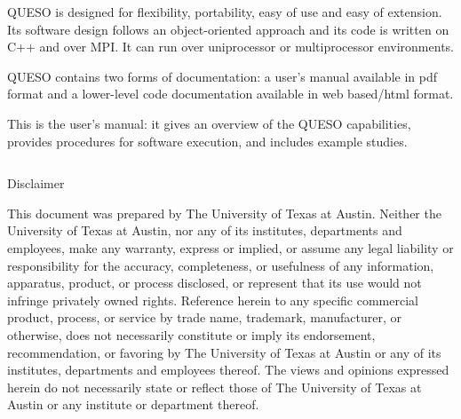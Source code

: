 QUESO is designed for flexibility, portability, easy of use and
easy of extension. Its software design follows an object-oriented
approach and its code is written on C++ and over MPI. It can run over
uniprocessor or multiprocessor environments.

QUESO contains two forms of documentation:
a user's manual available in pdf format
and
a lower-level code documentation available in web based/html format.

This is the user's manual: it gives an overview of the QUESO capabilities,
provides procedures for software execution, and includes example studies.

\clearpage
$~$\\

\clearpage
\centerline{\LARGE\sffamily Disclaimer}
$~$\\
    This document was prepared
    by The University of Texas at Austin.
    Neither the University of Texas
    at Austin, nor any of its institutes, departments and employees, make any warranty, express or implied,
    or assume any legal liability or responsibility for the accuracy, completeness, or
    usefulness of any information, apparatus, product, or process disclosed, or represent
    that its use would not infringe privately owned rights. Reference herein to any specific
    commercial product, process, or service by trade name, trademark, manufacturer, or otherwise,
    does not necessarily constitute or imply its endorsement, recommendation, or favoring by
    The University of Texas at Austin or any of its institutes, departments and employees thereof.
    The views and opinions expressed herein do not necessarily state or reflect
    those of The University of Texas at Austin or any institute or department
    thereof.


\clearpage
$~$\\

\clearpage
{\markboth{}{}
}
\tableofcontents 


